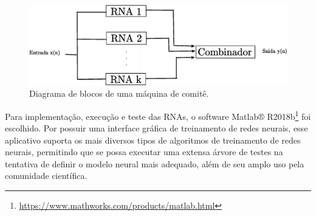\begin{figure}[H]
\centering
\includegraphics[width=1\textwidth]{figuras/comite.eps}
\caption{Diagrama de blocos de uma máquina de comitê.}
\label{fig:comite}
\end{figure}

Para implementação, execução e teste das RNAs, o software Matlab® R2018b\footnote{\href{ https://www.mathworks.com/products/matlab.html} {https://www.mathworks.com/products/matlab.html}} foi escolhido. Por possuir uma interface gráfica de treinamento de redes neurais, esse aplicativo suporta os mais diversos tipos de algoritmos de treinamento de redes neurais, permitindo que se possa executar uma extensa árvore de testes na tentativa de definir o modelo neural mais adequado, além de seu amplo uso pela comunidade científica.